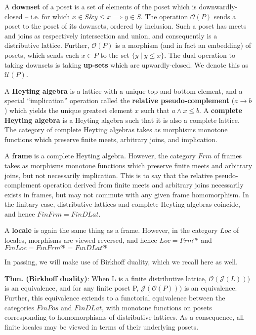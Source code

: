 \documentclass[hoptionsi,review,screen,format=sigconf]{acmart}
\theoremstyle{definition}
\newcommand{\Oc}{\mathcal{O}}
\newcommand{\Ucc}{\mathcal{U}}
\newcommand{\Jc}{\mathcal{J}}
\newcommand{\band}{\mathop{\&}}
\begin{document}
A \textbf{downset} of a poset is a set of elements of the poset which is downwardly-closed -- i.e. for which \(x \in S \band y \le x \implies y \in S\). The operation \(\Oc(P)\) sends a poset to the poset of its downsets, ordered by inclusion. Such a poset has meets and joins as respectively intersection and union, and consequently is a distributive lattice. Further, \(\Oc(P)\) is a morphism (and in fact an embedding) of posets, which sends each \(x \in P\) to the set \(\{y \mathbin{|} y \le x\}\). The dual operation to taking downsets is taking \textbf{up-sets}  which are upwardly-closed. We denote this as \(\Ucc(P)\).

A \textbf{Heyting algebra} is a lattice with a unique top and bottom element, and a special ``implication'' operation called the \textbf{relative pseudo-complement} (\(a \rightarrow b\)) which yields the unique greatest element \(x\) such that \(a \wedge x \le b\). A \textbf{complete Heyting algebra} is a Heyting algebra such that it is also a complete lattice. The category of complete Heyting algebras takes as morphisms monotone functions which preserve finite meets, arbitrary joins, and implication.

A \textbf{frame} is a complete Heyting algebra. However, the category \(Frm\) of frames takes as morphisms monotone functions which preserve finite meets and arbitrary joins, but not necessarily implication. This is to say that the relative pseudo-complement operation derived from finite meets and arbitrary joins necessarily exists in frames, but may not commute with any given frame homomorphism. In the finitary case, distributive lattices and complete Heyting algebras coincide, and hence \(FinFrm = FinDLat\).

A \textbf{locale} is again the same thing as a frame. However, in the category \(Loc\) of locales, morphisms are viewed reversed, and hence \(Loc = Frm^{op}\) and \(FinLoc = FinFrm^{op} = FinDLat^{op}\)

In passing, we will make use of Birkhoff duality, which we recall here as well.

\textbf{Thm. (Birkhoff duality)}: When L is a finite distributive lattice, \(\Oc(\Jc(L)))\) is an equivalence, and for any finite poset P,  \(\Jc(\Oc(P)))\) is an equivalence. Further, this equivalence extends to a functorial equivalence between the categories \(FinPos\) and \(FinDLat\), with monotone functions on posets corresponding to homomorphisms of distributive lattices. As a consequence, all finite locales may be viewed in terms of their underlying posets.
\end{document}

